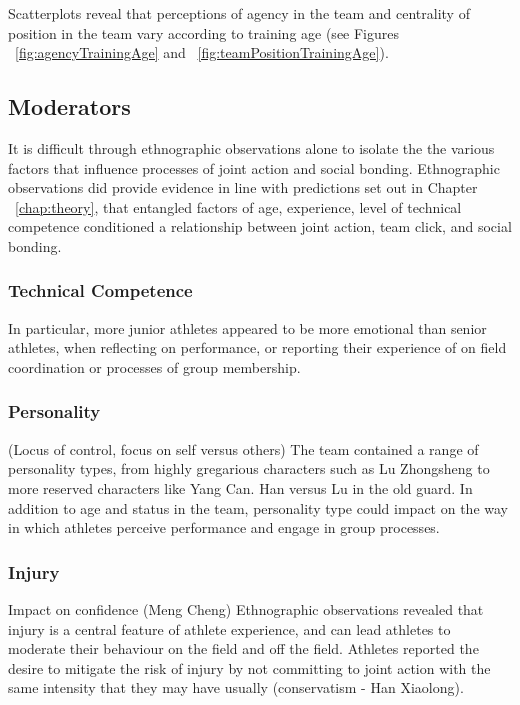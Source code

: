 \begin{CJK}{UTF8}{gbsn}
Scatterplots reveal that perceptions of agency in the team and centrality of position in the team vary according to training age (see Figures ~\ref{fig:agencyTrainingAge} and ~\ref{fig:teamPositionTrainingAge}).




\clearpage




\subsection{Moderators\label{sect:mods}}

It is difficult through ethnographic observations alone to isolate the the various factors that influence processes of joint action and social bonding.  Ethnographic observations did provide evidence in line with predictions set out in Chapter ~\ref{chap:theory}, that entangled factors of age, experience, level of technical competence conditioned a relationship between joint action, team click, and social bonding.

        \subsubsection{Technical Competence}

In particular, more junior athletes appeared to be more emotional than senior athletes, when reflecting on performance, or reporting their experience of on field coordination or processes of group membership.


        \subsubsection{Personality}

(Locus of control, focus on self versus others)
The team contained a range of personality types, from highly gregarious characters such as Lu Zhongsheng to more reserved characters like Yang Can.  Han versus Lu in the old guard.  In addition to age and status in the team, personality type could impact on the way in which athletes perceive performance and engage in group processes.

        \subsubsection{Injury}

Impact on confidence (Meng Cheng)
Ethnographic observations revealed that injury is a central feature of athlete experience, and can lead athletes to moderate their behaviour on the field and off the field.  Athletes reported the desire to mitigate the risk of injury by not committing to joint action with the same intensity that they may have usually (conservatism - Han Xiaolong).



\end{CJK}
